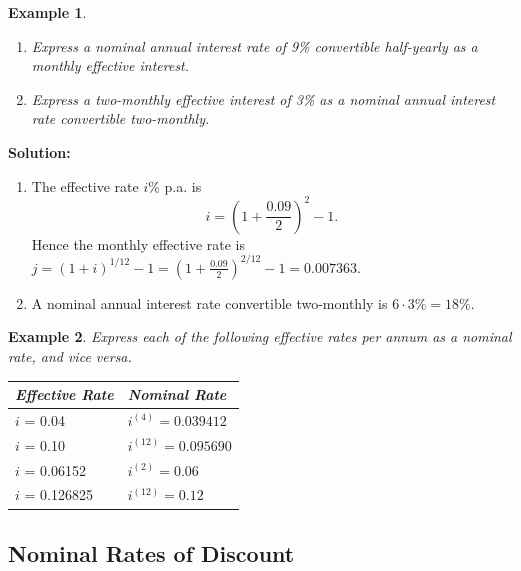 \documentclass[
]{book}
\theoremstyle{definition}
\theoremstyle{definition}
\newtheorem{example}{Example}[chapter]
\theoremstyle{definition}
\theoremstyle{definition}
\theoremstyle{remark}
\begin{document}
\begin{example}

\begin{enumerate}
\def\labelenumi{\arabic{enumi}.}
\item
  \emph{Express a nominal annual interest rate of 9\% convertible
  half-yearly as a monthly effective interest.}
\item
  \emph{Express a two-monthly effective interest of 3\% as a nominal annual
  interest rate convertible two-monthly.}
\end{enumerate}

\end{example}

\textbf{Solution:}

\begin{enumerate}
\def\labelenumi{\arabic{enumi}.}
\item
  The effective rate \(i\)\% p.a. is \[i = ( 1 + \frac{0.09}{2})^2 - 1.\]
  Hence the monthly effective rate is
  \(j = (1 + i)^{1/12} - 1 = ( 1 + \frac{0.09}{2})^{2/12} - 1 = 0.007363\).
\item
  A nominal annual interest rate convertible two-monthly is
  \(6 \cdot 3\% = 18\%\).
\end{enumerate}

\begin{example}

\emph{Express each of the following effective rates per annum as a nominal
rate, and vice versa.}

\begin{longtable}[]{@{}ll@{}}
\toprule()
\textbf{\emph{Effective Rate}} & \textbf{\emph{Nominal Rate}} \\
\midrule()
\endhead
\(i\) = 0.04 & \(i^{(4)} = 0.039412\) \\
\(i\) = 0.10 & \(i^{(12)} = 0.095690\) \\
\(i\) = 0.06152 & \(i^{(2)} = 0.06\) \\
\(i\) = 0.126825 & \(i^{(12)} = 0.12\) \\
\bottomrule()
\end{longtable}

\end{example}

\hypertarget{nominal-rates-of-discount}{%
\subsection{Nominal Rates of Discount}\label{nominal-rates-of-discount}}
\end{document}
